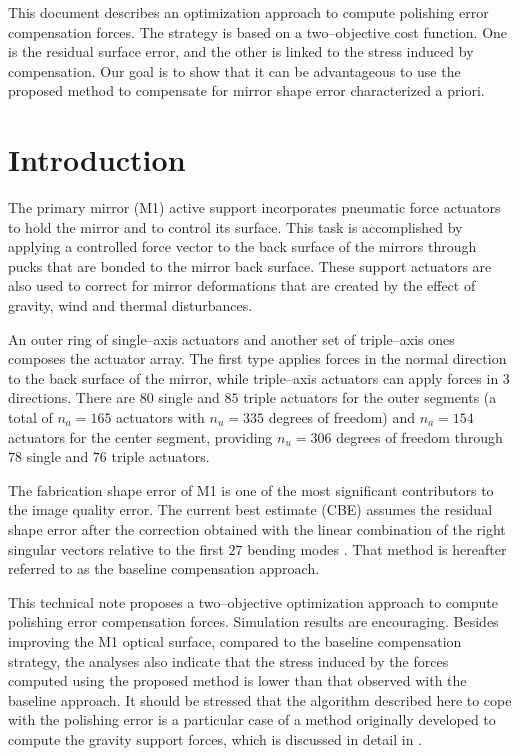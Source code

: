 \documentclass{gmto}
\begin{document}
This document describes an optimization approach to compute polishing error compensation forces. The strategy is based on a two--objective cost function. One is the residual surface error, and the other is linked to the stress induced by compensation. Our goal is to show that it can be advantageous to use the proposed method to compensate for mirror shape error characterized a priori.



\section{Introduction}
\label{sec:introduction}

The primary mirror (M1) active support incorporates pneumatic force actuators to hold the mirror and to control its surface. This task is accomplished by applying a controlled force vector to the back surface of the mirrors through pucks that are bonded to the mirror back surface. These support actuators are also used to correct for mirror deformations that are created by the effect of gravity, wind and thermal disturbances.

An outer ring of single--axis actuators and another set of triple--axis ones composes the actuator array. %
The first type applies forces in the normal direction to the back surface of the mirror, while triple--axis actuators can apply forces in $3$ directions. There are $80$ single and $85$ triple actuators for the outer segments (a total of $n_a=165$ actuators with $n_u = 335$ degrees of freedom) and $n_a=154$ actuators for the center segment, providing $n_u = 306$ degrees of freedom through $78$ single and $76$ triple actuators.


The fabrication shape error of M1 is one of the most significant contributors to the image quality error. The current best estimate (CBE) assumes the residual shape error after the correction obtained with the linear combination of the right singular vectors relative to the first $27$ bending modes \cite[Section 6.3.1.1]{GMT_DOC_04680}. That method is hereafter referred to as the baseline compensation approach. %

This technical note proposes a two--objective optimization approach to compute polishing error compensation forces. Simulation results are encouraging.  Besides improving the M1 optical surface, compared to the baseline compensation strategy, the analyses also indicate that the stress induced by the forces computed using the proposed method is lower than that observed with the baseline approach.%
It should be stressed that the algorithm described here to cope with the polishing error is a particular case of a method originally developed to compute the gravity support forces, which is discussed in detail in \cite{Romano2020a}.
\end{document}
